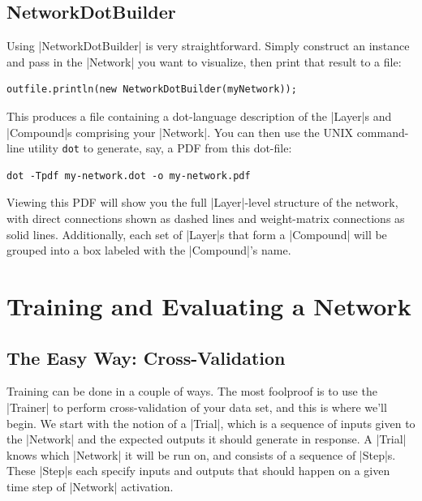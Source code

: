 \documentclass{article}
\begin{document}
\subsection{NetworkDotBuilder}

Using |NetworkDotBuilder| is very straightforward. Simply construct an instance and pass in the |Network| you want to visualize, then print that result to a file:

\begin{verbatim}
outfile.println(new NetworkDotBuilder(myNetwork));
\end{verbatim}

This produces a file containing a dot-language description of the |Layer|s and |Compound|s comprising your |Network|. You can then use the UNIX command-line utility \texttt{dot} to generate, say, a PDF from this dot-file:

\begin{verbatim}
dot -Tpdf my-network.dot -o my-network.pdf
\end{verbatim}

Viewing this PDF will show you the full |Layer|-level structure of the network, with direct connections shown as dashed lines and weight-matrix connections as solid lines. Additionally, each set of |Layer|s that form a |Compound| will be grouped into a box labeled with the |Compound|'s name.

\section{Training and Evaluating a Network}

\subsection{The Easy Way: Cross-Validation}

Training can be done in a couple of ways. The most foolproof is to use the  |Trainer| to
perform cross-validation of your data set, and this is where we'll begin. We start with the notion
of a  |Trial|, which is a sequence of inputs given to the |Network| and the expected outputs it should
generate in response. A  |Trial| knows which |Network| it will be run on, and consists of a sequence of
 |Step|s. These  |Step|s each specify inputs and outputs that should happen on a given time step
of |Network| activation.
\end{document}
